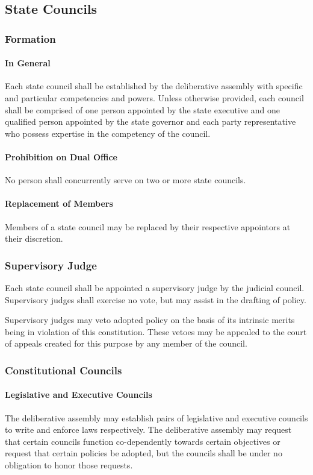 \documentclass{article}
\begin{document}
\subsection{State Councils}
\subsubsection{Formation}
\paragraph{In General}
Each state council shall be established by the deliberative assembly with specific and particular competencies and powers. Unless otherwise provided, each council shall be comprised of one person appointed by the state executive and one qualified person appointed by the state governor and each party representative who possess expertise in the competency of the council. 
\paragraph{Prohibition on Dual Office}
No person shall concurrently serve on two or more state councils.
\paragraph{Replacement of Members}
Members of a state council may be replaced by their respective appointors at their discretion.
\subsubsection{Supervisory Judge}
Each state council shall be appointed a supervisory judge by the judicial council. Supervisory judges shall exercise no vote, but may assist in the drafting of policy.

Supervisory judges may veto adopted policy on the basis of its intrinsic merits being in violation of this constitution. These vetoes may be appealed to the court of appeals created for this purpose by any member of the council.
\subsubsection{Constitutional Councils}
\paragraph{Legislative and Executive Councils}
The deliberative assembly may establish pairs of legislative and executive councils to write and enforce laws respectively. The deliberative assembly may request that certain councils function co-dependently towards certain objectives or request that certain policies be adopted, but the councils shall be under no obligation to honor those requests.
\end{document}
